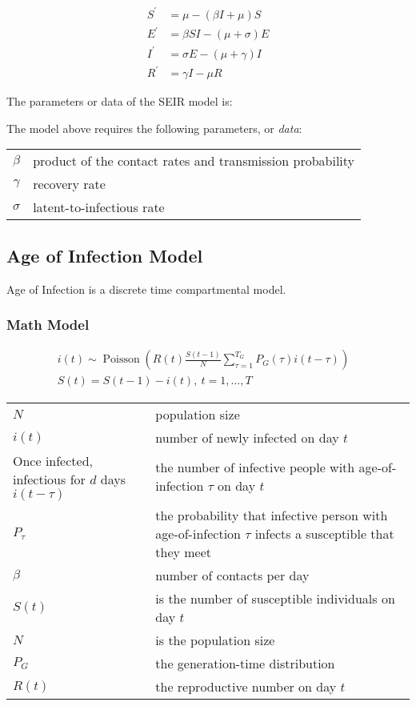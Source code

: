 \documentclass[11pt,a4paper,titlepage]{article}
\newcommand*{\dt}[1]{\ensuremath{#1^{\prime}}}%
\theoremstyle{definition}
\begin{document}
\begin{align}
    \dt{S} & = \mu - (\beta I + \mu) S \\%
    \dt{E} & = \beta S I - (\mu + \sigma) E \\%
    \dt{I} & = \sigma E - (\mu + \gamma) I \\%
    \dt{R} & = \gamma I - \mu R %
\end{align}

The parameters or data of the SEIR model is:

The model above requires the following parameters,
or \textit{data}:

\begin{tabular}{cl}
    $\beta$ & product of the contact rates and transmission probability\\%
    $\gamma$ & recovery rate \\%
    $\sigma$ & latent-to-infectious rate
\end{tabular}

\subsection{Age of Infection Model}
\label{subsec:math-models:aoi}

Age of Infection is a discrete time compartmental model.

\subsubsection{Math Model}

\begin{align}
    i(t) \sim \operatorname{Poisson} \left( R(t) \frac{S(t-1)}{N} \sum\limits_{\tau=1}^{T_G} {P_G(\tau)i(t-\tau)} \right) & \\
    S(t) = S(t - 1) - i(t), ~t=1,\ldots,T &
\end{align}

\begin{tabular}{ll}
    $N$ & population size \\
    $i(t)$ &  number of newly infected on day $t$ \\
    Once infected, infectious for $d$ days
    $i(t-\tau)$ & the number of infective people with age-of-infection $\tau$ on day $t$ \\
    $P_{\tau}$ & the probability that infective person with age-of-infection $\tau$ infects a susceptible that they meet \\
    $\beta$ & number of contacts per day \\
    $S(t)$ &  is the number of susceptible individuals on day $t$ \\
    $N$ & is the population size \\
    $P_G$ & the generation-time distribution \\
    $R(t)$ &  the reproductive number on day $t$ \\
\end{tabular}
\end{document}
